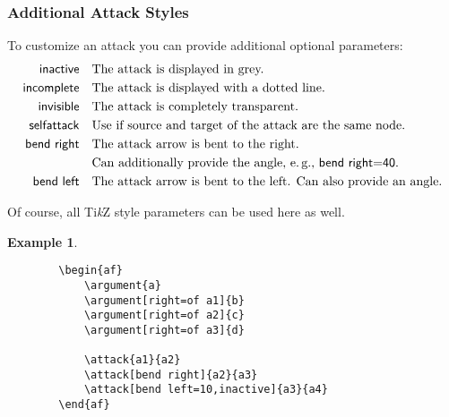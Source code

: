 \documentclass{article}
\newcommand{\tikzname}{Ti\emph{k}Z\xspace}
\newtheorem{example}{Example}
\begin{document}
\subsubsection{Additional Attack Styles}
    To customize an attack you can provide additional optional parameters:
    \begin{align*}
        \mathsf{inactive} &\quad \text{The attack is displayed in grey.}\\
        \mathsf{incomplete} &\quad \text{The attack is displayed with a dotted line.}\\
        \mathsf{invisible} &\quad \text{The attack is completely transparent.}\\
        \mathsf{selfattack} &\quad \text{Use if source and target of the attack are the same node.}\\
        \mathsf{bend~right} &\quad \text{The attack arrow is bent to the right.}\\
        &\quad \text{Can additionally provide the angle, e.\,g., \textsf{bend~right=40}.}\\
        \mathsf{bend~left} &\quad \text{The attack arrow is bent to the left. Can also provide an angle.}
    \end{align*}
    
    Of course, all \tikzname style parameters can be used here as well.

    \begin{example}~
    \begin{verbatim}
        \begin{af}
            \argument{a}
            \argument[right=of a1]{b}
            \argument[right=of a2]{c}
            \argument[right=of a3]{d}
    
            \attack{a1}{a2}
            \attack[bend right]{a2}{a3}
            \attack[bend left=10,inactive]{a3}{a4}
        \end{af}
    \end{verbatim}

    \begin{center}
        \begin{af}
    
        \end{af}
    \end{center}
    \end{example}
\end{document}
